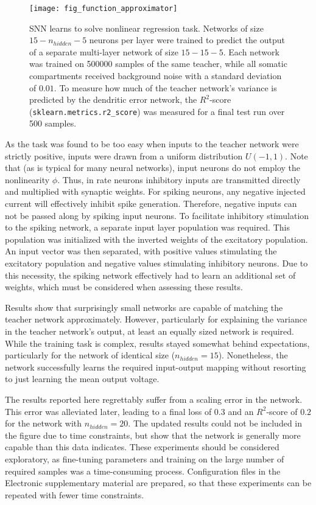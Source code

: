 \begin{figure}[h]
    \centering
    \texttt{[image: fig\_function\_approximator]}
    \caption[SNN learns to solve nonlinear regression task.]{SNN learns to solve nonlinear regression task. Networks of
    size $15-n_{hidden}-5$ neurons per layer were trained to predict the output of a separate multi-layer network of
    size $15-15-5$. Each network was trained on 500000 samples of the same teacher, while all somatic compartments
    received background noise with a standard deviation of $0.01$. To measure how much of the teacher network's variance
    is predicted by the dendritic error network, the $R^2$-score
    (\texttt{sklearn.metrics.r2\_score})
    was measured for a final test run over 500 samples.}
    \label{fig-func-approx}
\end{figure}

As the task was found to be too easy when inputs to the teacher network were strictly positive, inputs were drawn from a
uniform distribution $U(-1,1)$. Note that (as is typical for many neural networks), input neurons do not employ the
nonlinearity $\phi$. Thus, in rate neurons inhibitory inputs are transmitted directly and multiplied with synaptic
weights. For spiking neurons, any negative injected current will effectively inhibit spike generation. Therefore,
negative inputs can not be passed along by spiking input neurons. To facilitate inhibitory stimulation to the spiking
network, a separate input layer population was required. This population was initialized with the inverted weights of
the excitatory population. An input vector was then separated, with positive values stimulating the excitatory
population and negative values stimulating inhibitory neurons. Due to this necessity, the spiking network effectively
had to learn an additional set of weights, which must be considered when assessing these results.

Results show that surprisingly small networks are capable of matching the teacher network approximately. However,
particularly for explaining the variance in the teacher network's output, at least an equally sized network  is
required. While the training task is complex, results stayed somewhat behind expectations, particularly for the network
of identical size ($n_{hidden} = 15$). Nonetheless, the network successfully learns the required input-output mapping
without resorting to just learning the mean output voltage. 


The results reported here regrettably suffer from a scaling error in the network. This error was alleviated later,
leading to a final loss of $0.3$ and an $R^2$-score of $0.2$ for the network with $n_{hidden} = 20$. The updated results
could not be included in the figure due to time constraints, but show that the network is generally more capable than
this data indicates. These experiments should be considered exploratory, as fine-tuning parameters and training on the
large number of required samples was a time-consuming process. Configuration files in the Electronic supplementary
material are prepared, so that these experiments can be repeated with fewer time constraints.


